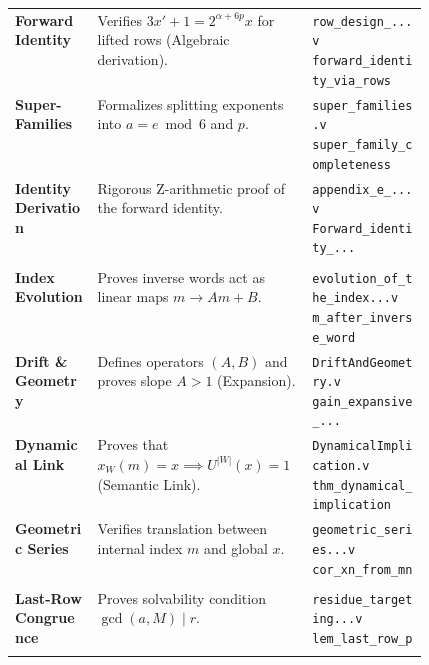 \documentclass[11pt,letterpaper]{amsart}
\theoremstyle{definition}
\theoremstyle{plain}
\theoremstyle{plain}
\theoremstyle{remark}
\begin{document}
\begin{xltabular}{\linewidth}{@{}>{\raggedright\arraybackslash}p{0.20\linewidth} X >{\raggedright\arraybackslash}p{0.28\linewidth}@{}}
\textbf{Forward Identity} &
  Verifies $3x'+1=2^{\alpha+6p}x$ for lifted rows (Algebraic derivation). &
  \texttt{row\_design\_...v} \newline
  \texttt{forward\_identity\_via\_rows} \\
\addlinespace[4pt]

\textbf{Super-Families} &
  Formalizes splitting exponents into $a = e \bmod 6$ and $p$. &
  \texttt{super\_families.v} \newline
  \texttt{super\_family\_completeness} \\
\addlinespace[4pt]

\textbf{Identity Derivation} &
  Rigorous Z-arithmetic proof of the forward identity. &
  \texttt{appendix\_e\_...v} \newline
  \texttt{Forward\_identity\_...} \\

\midrule
{} \\
\midrule
\textbf{Index Evolution} &
  Proves inverse words act as linear maps $m \to Am+B$. &
  \texttt{evolution\_of\_the\_index...v} \newline
  \texttt{m\_after\_inverse\_word} \\
\addlinespace[4pt]

\textbf{Drift \& Geometry} &
  Defines operators $(A,B)$ and proves slope $A>1$ (Expansion). &
  \texttt{DriftAndGeometry.v} \newline
  \texttt{gain\_expansive\_...} \\
\addlinespace[4pt]

\textbf{Dynamical Link} &
  Proves that $x_W(m)=x \implies U^{|W|}(x)=1$ (Semantic Link). &
  \texttt{DynamicalImplication.v} \newline
  \texttt{thm\_dynamical\_implication} \\
\addlinespace[4pt]

\textbf{Geometric Series} &
  Verifies translation between internal index $m$ and global $x$. &
  \texttt{geometric\_series...v} \newline
  \texttt{cor\_xn\_from\_mn} \\

\midrule
{} \\
\midrule
\textbf{Last-Row Congruence} &
  Proves solvability condition $\gcd(a, M) \mid r$. &
  \texttt{residue\_targeting...v} \newline
  \texttt{lem\_last\_row\_p} \\
\addlinespace[4pt]


\end{xltabular}
\end{document}

